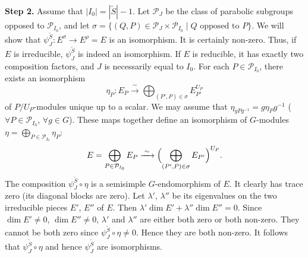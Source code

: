\documentclass[12pt,a4paper]{article}
\theoremstyle{plain}
\theoremstyle{definition}
\theoremstyle{remark}
\newcommand{\cP}{\mathcal{P}}
\providecommand{\cP}{\mathcal{P}}
\begin{document}
\smallskip
\noindent\textbf{Step 2.} Assume that $|I_0| = |\tilde{S}| - 1$. Let $\cP_J$ be the class of parabolic subgroups opposed to $\cP_{I_0}$, and let $\sigma = \{(Q,P) \in \cP_J \times \cP_{I_0} \mid \text{$Q$ opposed to $P$}\}$. We will show that $\psi_J^{\tilde{S}} \colon E^\sigma \to E^\rho = E$ is an isomorphism. It is certainly non-zero. Thus, if $E$ is irreducible, $\psi_J^{\tilde{S}}$ is indeed an isomorphism. If $E$ is reducible, it has exactly two composition factors, and $J$ is necessarily equal to $I_0$. For each $P \in \cP_{I_0}$, there exists an isomorphism
\begin{equation*}
\eta_P \colon E_P \xrightarrow{\;\sim\;} \bigoplus_{(P',P) \in \sigma} E_{P'}^{U_P}
\end{equation*}
of $P/U_P$-modules unique up to a scalar. We may assume that $\eta_{gPg^{-1}} = g\eta_P g^{-1}$ ($\forall P \in \cP_{I_0}$, $\forall g \in G$). These maps together define an isomorphism of $G$-modules $\eta = \bigoplus_{P \in \cP_{I_0}} \eta_P$:
\begin{equation*}
E = \bigoplus_{P \in \cP_{I_0}} E_P \xrightarrow{\;\sim\;} \Bigl(\bigoplus_{(P',P) \in \sigma} E_{P'}\Bigr)^{U_P}.
\end{equation*}
The composition $\psi_J^{\tilde{S}} \circ \eta$ is a semisimple $G$-endomorphism of $E$. It clearly has trace zero (its diagonal blocks are zero). Let $\lambda'$, $\lambda''$ be its eigenvalues on the two irreducible pieces $E'$, $E''$ of $E$. Then $\lambda' \dim E' + \lambda'' \dim E'' = 0$. Since $\dim E' \neq 0$, $\dim E'' \neq 0$, $\lambda'$ and $\lambda''$ are either both zero or both non-zero. They cannot be both zero since $\psi_J^{\tilde{S}} \circ \eta \neq 0$. Hence they are both non-zero. It follows that $\psi_J^{\tilde{S}} \circ \eta$ and hence $\psi_J^{\tilde{S}}$ are isomorphisms.
\end{document}
